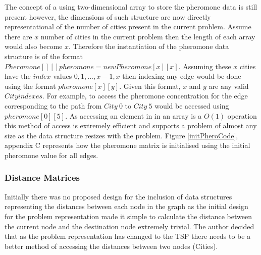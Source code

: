 The concept of a using two-dimensional array to store the pheromone data is still present however, the dimensions of such structure are now directly representational of the number of cities present in the current problem. Assume there are $x$ number of cities in the current problem then the length of each array would also become $x$. Therefore the instantiation of the pheromone data structure is of the format $Pheromone[][] pheromone = new Pheromone[x][x]$. Assuming these $x$ cities have the $index$ values $0, 1, ..., x-1, x$ then indexing any edge would be done using the format $pheromone[x][y]$. Given this format, $x$ and $y$ are any valid $City indexes$. For example, to access the pheromone concentration for the edge corresponding to the path from $City\ 0$ to $City\ 5$ would be accessed using $pheromone[0][5]$. As accessing an element in in an array is a $O(1)$ operation this method of access is extremely efficient and supports a problem of almost any size as the data structure resizes with the problem. Figure \ref{initPheroCode}, appendix C represents how the pheromone matrix is initialised using the initial pheromone value for all edges.

\subsubsection{Distance Matrices}

Initially there was no proposed design for the inclusion of data structures representing the distances between each node in the graph as the initial design for the problem representation made it simple to calculate the distance between the current node and the destination node extremely trivial. The author decided that as the problem representation has changed to the TSP there needs to be a better method of accessing the distances between two nodes (Cities).

